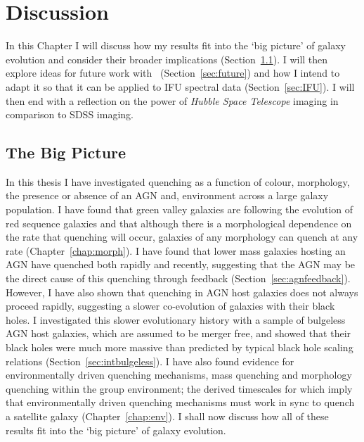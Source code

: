 \chapter{Discussion}\label{chap:discussion}

In this Chapter I will discuss how my results fit into the `big picture' of galaxy evolution and consider their broader implications (Section~\ref{sec:bigpic}). I will then explore ideas for future work with \starpy\ (Section~\ref{sec:future}) and how I intend to adapt it so that it can be applied to IFU spectral data (Section~\ref{sec:IFU}). I will then end with a reflection on the power of \emph{Hubble Space Telescope} imaging in comparison to SDSS imaging. 


\section{The Big Picture}\label{sec:bigpic}

In this thesis I have investigated quenching as a function of colour, morphology, the presence or absence of an AGN and, environment across a large galaxy population. I have found that green valley galaxies are following the evolution of red sequence galaxies and that although there is a morphological dependence on the rate that quenching will occur, galaxies of any morphology can quench at any rate (Chapter~\ref{chap:morph}). I have found that lower mass galaxies hosting an AGN have quenched both rapidly and recently, suggesting that the AGN may be the direct cause of this quenching through feedback (Section~\ref{sec:agnfeedback}). However, I have also shown that quenching in AGN host galaxies does not always proceed rapidly, suggesting a slower co-evolution of galaxies with their black holes. I investigated this slower evolutionary history with a sample of bulgeless AGN host galaxies, which are assumed to be merger free, and showed that their black holes were much more massive than predicted by typical black hole scaling relations (Section~\ref{sec:intbulgeless}). I have also found evidence for environmentally driven quenching mechanisms, mass quenching and morphology quenching within the group environment; the derived timescales for which imply that environmentally driven quenching mechanisms must work in sync to quench a satellite galaxy (Chapter~\ref{chap:env}). I shall now discuss how all of these results fit into the `big picture' of galaxy evolution. 

